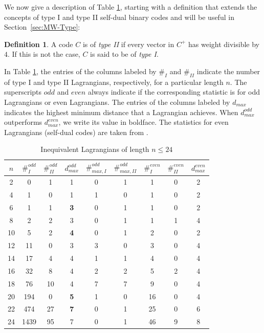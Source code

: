 \documentclass[a4paper,reqno]{amsart}
\theoremstyle{definition}
\newtheorem{df}[theorem]{Definition}
\theoremstyle{remark} \newtheorem{remark}[theorem]{Remark}
\numberwithin{equation}{section}
\begin{document}
We now give a description of Table \ref{Table:OddLag}, starting with a definition that extends the concepts of type I and type II self-dual binary codes and will be useful in Section~\ref{sec:MW-Type}:
\begin{df}
A code \(C\) is of \emph{type II} if every vector in \(C^+\) has weight divisible by \(4\). 
If this is not the case, \(C\) is said to be of \emph{type I}.
\end{df}
In Table \ref{Table:OddLag}, the entries of the columns labeled by \(\#_I\) and \(\#_{II}\) indicate the number of type I and type II Lagrangians, respectively, for a particular length \(n\). The superscripts \(odd\) and \(even\) always indicate if the corresponding statistic is for odd Lagrangians or even Lagrangians. The entries of the columns labeled by \(d_{max}\) indicates the highest minimum distance that a Lagrangian achieves. When \(d_{max}^{odd}\) outperforms \(d_{max}^{even}\), we write its value in boldface. The statistics for even Lagrangians (self-dual codes) are taken from \cite{Bouy12}.

\begin{table}[ht]
    \centering
    \begin{tabular}{|c|c|c|c|c|c|c|c|c|}
        \hline
         \(n\) & \(\#_I^{odd}\) & \(\#_{II}^{odd}\) & \(d_{max}^{odd}\) & \(\#_{max,I}^{odd}\) & \(\#_{max,II}^{odd}\) & \(\#_I^{even}\) & \(\#_{II}^{even}\) & \(d_{max}^{even}\) \\ \hline
         2 & 0 & 1 & 1 & 0 & 1 & 1 & 0 & 2 \\ 
         4 & 1 & 0 & 1 & 1 & 0 & 1 & 0 & 2 \\
         6 & 1 & 1 & \textbf{3} & 0 & 1 & 1 & 0 & 2 \\
         8 & 2 & 2 & 3 & 0 & 1 & 1 & 1 & 4 \\
         10 & 5 & 2 & \textbf{4} & 0 & 1 & 2 & 0 & 2 \\
         12 & 11 & 0 & 3 & 3 & 0 & 3 & 0 & 4 \\
         14 & 17 & 4 & 4 & 1 & 1 & 4 & 0 & 4 \\
         16 & 32 & 8 & 4 & 2 & 2 & 5 & 2 & 4 \\
         18 & 76 & 10 & 4 & 7 & 7 & 9 & 0 & 4 \\
         20 & 194 & 0 & \textbf{5} & 1 & 0 & 16 & 0 & 4 \\
         22 & 474 & 27 & \textbf{7} & 0 & 1 & 25 & 0 & 6 \\
         24 & 1439 & 95 & 7 & 0 & 1 & 46 & 9 & 8 \\
         \hline
    \end{tabular}
    \vspace{6pt}
    \caption{Inequivalent Lagrangians of length \(n \leq 24\)}
    \label{Table:OddLag}
\end{table}
\end{document}
